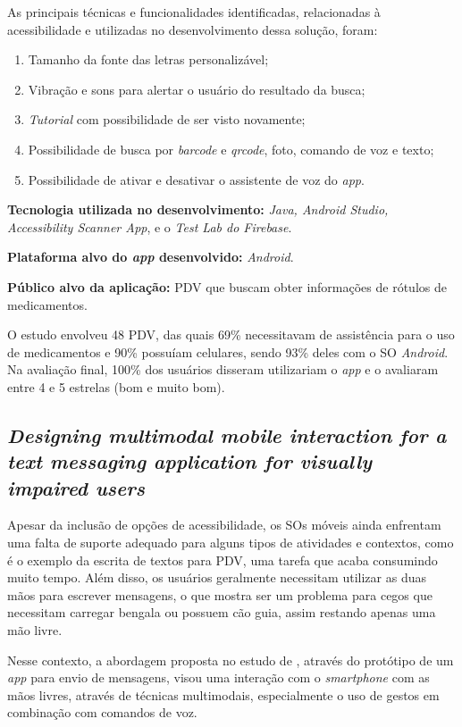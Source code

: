 As principais técnicas e funcionalidades identificadas, relacionadas à acessibilidade e utilizadas no desenvolvimento dessa solução, foram:

\begin{enumerate}
    \item Tamanho da fonte das letras personalizável;
    \item Vibração e sons para alertar o usuário do resultado da busca;
    \item \emph{Tutorial} com possibilidade de ser visto novamente;
    \item Possibilidade de busca por \emph{barcode} e \emph{qrcode}, foto, comando de voz e texto;
    \item Possibilidade de ativar e desativar o assistente de voz do \emph{app}.
\end{enumerate}

\textbf{Tecnologia utilizada no desenvolvimento:} \emph{Java, Android Studio, Accessibility Scanner App}, e o \emph{Test Lab do Firebase}.

\textbf{Plataforma alvo do \emph{app} desenvolvido:} \emph{Android}.

\textbf{Público alvo da aplicação:} PDV que buscam obter informações de rótulos de medicamentos\@.

O estudo envolveu 48 PDV, das quais 69\% necessitavam de assistência para o uso de medicamentos e 90\% possuíam celulares, sendo 93\%  deles com o SO \emph{Android}.
Na avaliação final, 100\% dos usuários disseram utilizariam o \emph{app} e o avaliaram entre 4 e 5 estrelas (bom e muito bom).


\subsection{\emph{Designing multimodal mobile interaction for a text messaging application for visually impaired users}}

Apesar da inclusão de opções de acessibilidade, os SOs móveis ainda enfrentam uma falta de suporte adequado para alguns tipos de atividades e contextos, como é o exemplo da escrita de textos para PDV, uma tarefa que acaba consumindo muito tempo.
Além disso, os usuários geralmente necessitam utilizar as duas mãos para escrever mensagens, o que mostra ser um problema para cegos que necessitam carregar bengala ou possuem cão guia, assim restando apenas uma mão livre.

Nesse contexto, a abordagem proposta no estudo de , através do protótipo de um \emph{app} para envio de mensagens, visou uma interação com o \emph{smartphone} com as mãos livres, através de técnicas multimodais, especialmente o uso de gestos em combinação com comandos de voz.

